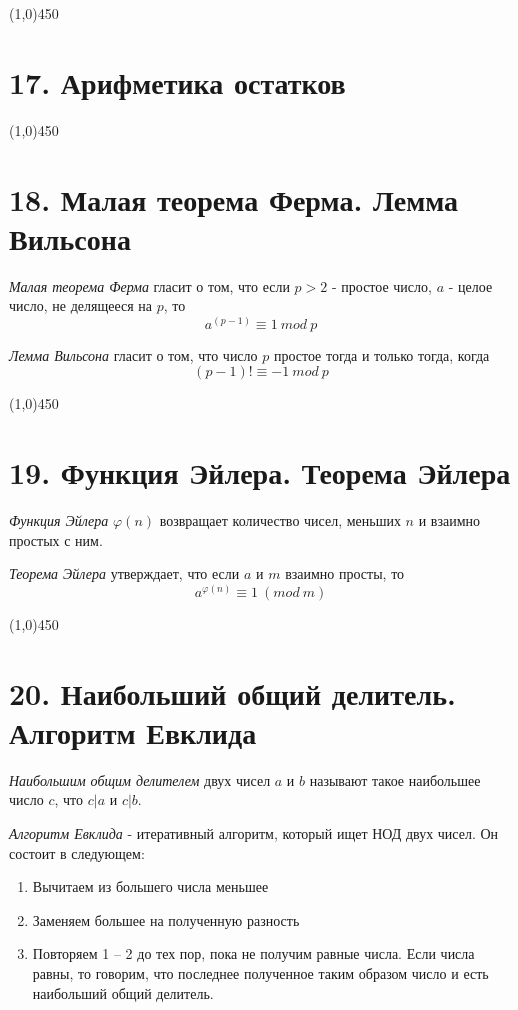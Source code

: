 \documentclass[a4paper,12pt]{article}
\renewcommand{\phi}{\varphi}
\begin{document}
	\begin{center}
		\line(1,0){450}
	\end{center}

	\section*{17. Арифметика остатков}

	\begin{center}
		\line(1,0){450}
	\end{center}

	\section*{18. Малая теорема Ферма. Лемма Вильсона}
	\textit{Малая теорема Ферма} гласит о том, что если $p > 2$ - простое число, $a$ - целое число, не делящееся на $p$, то
	\[
	a^{(p-1)} \equiv 1 \ mod \ p
	\]

	\textit{Лемма Вильсона} гласит о том, что число $p$ простое тогда и только тогда, когда
	\[
	(p - 1)! \equiv -1 \ mod \ p
	\]

	\begin{center}
		\line(1,0){450}
	\end{center}

	\section*{19. Функция Эйлера. Теорема Эйлера}
	\textit{Функция Эйлера} $\phi(n)$ возвращает количество чисел, меньших $n$ и взаимно простых с ним.

	\textit{Теорема Эйлера} утверждает, что если $a$ и $m$ взаимно просты, то
	\[
	a^{\phi(n)} \equiv 1 \ (mod \ m)
	\]

	\begin{center}
		\line(1,0){450}
	\end{center}

	\section*{20. Наибольший общий делитель. Алгоритм Евклида}
	\textit{Наибольшим общим делителем} двух чисел $a$ и $b$ называют такое наибольшее число $c$, что $c|a$ и $c|b$.

	\textit{Алгоритм Евклида} - итеративный алгоритм, который ищет НОД двух чисел. Он состоит в следующем:
	\begin{enumerate}
		\item Вычитаем из большего числа меньшее
		\item Заменяем большее на полученную разность
		\item Повторяем 1 -- 2 до тех пор, пока не получим равные числа. Если числа равны, то говорим, что последнее полученное таким образом число и есть наибольший общий делитель.
	\end{enumerate}
\end{document}
